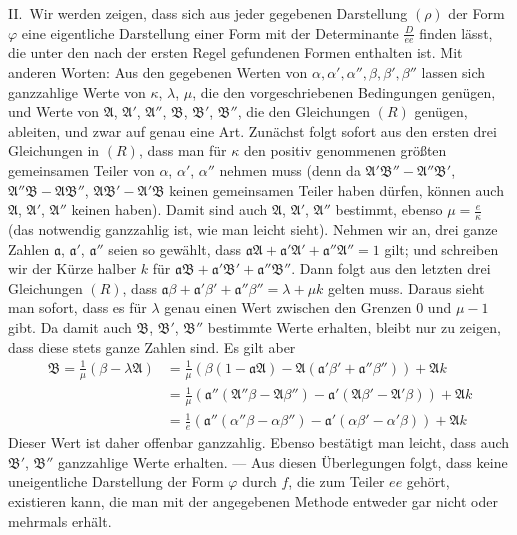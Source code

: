 II.\ Wir werden zeigen, dass sich aus jeder gegebenen Darstellung
$(\rho)$ der Form $\varphi$ eine eigentliche Darstellung einer Form mit
der Determinante $\frac{D}{ee}$ finden lässt, die unter den nach der ersten
Regel gefundenen Formen enthalten ist. Mit anderen Worten: Aus den
gegebenen Werten von $\alpha,\allowbreak \alpha',\allowbreak \alpha'',\allowbreak \beta,\allowbreak \beta',\allowbreak \beta''$ lassen sich ganzzahlige Werte von $\kappa$,
$\lambda$, $\mu$, die den vorgeschriebenen Bedingungen genügen, und
Werte von $\mathfrak{A}$, $\mathfrak{A}'$, $\mathfrak{A}''$, $\mathfrak{B}$, $\mathfrak{B}'$, $\mathfrak{B}''$,
die den Gleichungen $(R)$ genügen, ableiten, und zwar auf genau eine
Art. Zunächst folgt sofort aus den ersten drei Gleichungen in $(R)$,
dass man für $\kappa$ den positiv genommenen größten gemeinsamen Teiler
von $\alpha$, $\alpha'$, $\alpha''$ nehmen muss (denn da $\mathfrak{A}'\mathfrak{B}''-\mathfrak{A}''\mathfrak{B}'$, $\mathfrak{A}''\mathfrak{B}-\mathfrak{A}\mathfrak{B}''$,
$\mathfrak{A}\mathfrak{B}'-\mathfrak{A}'\mathfrak{B}$ keinen gemeinsamen Teiler haben dürfen, können auch $\mathfrak{A}$,
$\mathfrak{A}'$, $\mathfrak{A}''$ keinen haben). Damit sind auch $\mathfrak{A}$, $\mathfrak{A}'$,
$\mathfrak{A}''$ bestimmt, ebenso $\mu=\frac{e}{\kappa}$ (das notwendig ganzzahlig ist, wie
man leicht sieht). Nehmen wir an, drei ganze Zahlen $\mathfrak{a}$, $\mathfrak{a}'$,
$\mathfrak{a}''$ seien so gewählt, dass $\mathfrak{a}\mathfrak{A}+\mathfrak{a}'\mathfrak{A}'+\mathfrak{a}''\mathfrak{A}''=1$ gilt; und schreiben wir der
Kürze halber $k$ für $\mathfrak{a}\mathfrak{B}+\mathfrak{a}'\mathfrak{B}'+\mathfrak{a}''\mathfrak{B}''$.
Dann folgt aus den letzten drei Gleichungen $(R)$, dass $\mathfrak{a}\beta+\mathfrak{a}'\beta'+\mathfrak{a}''\beta''=\lambda+\mu k$
gelten muss. Daraus sieht man sofort, dass es für $\lambda$ genau einen
Wert zwischen den Grenzen $0$ und $\mu-1$ gibt. Da damit auch
$\mathfrak{B}$, $\mathfrak{B}'$, $\mathfrak{B}''$ bestimmte Werte erhalten, bleibt nur zu
zeigen, dass diese stets ganze Zahlen sind. Es gilt aber
\[
\begin{aligned}
\mathfrak{B}=\frac{1}{\mu}(\beta-\lambda\mathfrak{A})
&=\frac{1}{\mu}(\beta(1-\mathfrak{a}\mathfrak{A})-\mathfrak{A}(\mathfrak{a}'\beta'+\mathfrak{a}''\beta''))+\mathfrak{A}k\\
&=\frac{1}{\mu}(\mathfrak{a}''(\mathfrak{A}''\beta-\mathfrak{A}\beta'')-\mathfrak{a}'(\mathfrak{A}\beta'-\mathfrak{A}'\beta))+\mathfrak{A}k\\
&=\frac{1}{e}(\mathfrak{a}''(\alpha''\beta-\alpha\beta'')-\mathfrak{a}'(\alpha\beta'-\alpha'\beta))+\mathfrak{A}k
\end{aligned}
\]
Dieser Wert ist daher offenbar ganzzahlig. Ebenso bestätigt man leicht, dass
auch $\mathfrak{B}'$, $\mathfrak{B}''$ ganzzahlige Werte erhalten. --- Aus diesen
Überlegungen folgt, dass keine uneigentliche Darstellung der Form
$\varphi$ durch $f$, die zum Teiler $ee$ gehört, existieren kann,
die man mit der angegebenen Methode entweder gar nicht oder mehrmals erhält.

